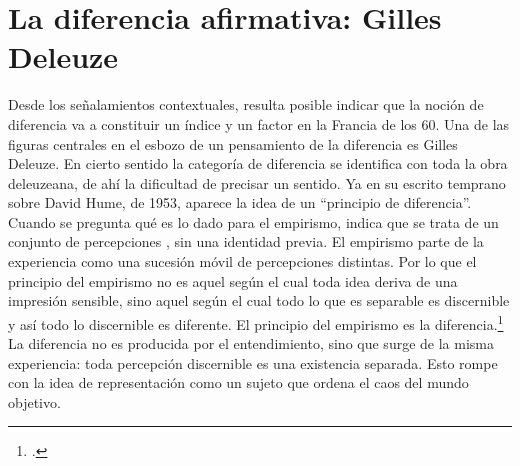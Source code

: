   \section{La diferencia afirmativa: Gilles Deleuze}

Desde los señalamientos contextuales, resulta posible indicar que la noción de diferencia va a constituir un índice y un factor en la Francia de los 60. Una de las figuras centrales en el esbozo de un pensamiento de la diferencia es Gilles Deleuze. En cierto sentido la categoría de diferencia se identifica con toda la obra deleuzeana, de ahí la dificultad de precisar un sentido. Ya en su escrito temprano sobre David Hume, de 1953, aparece la idea de un \enquote{principio de diferencia}. Cuando se pregunta qué es lo dado para el empirismo, indica que se trata de un conjunto de percepciones , sin una identidad previa. El empirismo parte de la experiencia como una sucesión móvil de percepciones distintas. Por lo que el principio del empirismo no es aquel según el cual toda idea deriva de una impresión sensible, sino aquel según el cual todo lo que es separable es discernible y así todo lo discernible es diferente. El principio del empirismo es la diferencia.\footcite{@6970-DELEUZE1996} La diferencia no es producida por el entendimiento, sino que surge de la misma experiencia: toda percepción discernible es una existencia separada. Esto rompe con la idea de representación como un sujeto que ordena el caos del mundo objetivo.


